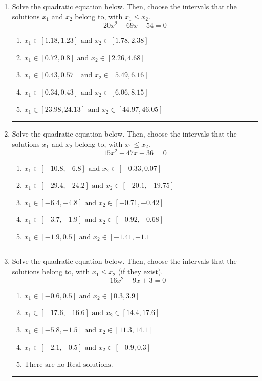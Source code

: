 \documentclass[14pt]{extbook}
\newcommand{\litem}[1]{\item#1\hspace*{-1cm}\rule{\textwidth}{0.4pt}}
\begin{document}
\begin{enumerate}
{\begin{enumerate}[label=\Alph*.]
\end{enumerate} }
\litem{
Solve the quadratic equation below. Then, choose the intervals that the solutions $x_1$ and $x_2$ belong to, with $x_1 \leq x_2$.\[ 20x^{2} -69 x + 54 = 0 \]\begin{enumerate}[label=\Alph*.]
\item \( x_1 \in [1.18, 1.23] \text{ and } x_2 \in [1.78, 2.38] \)
\item \( x_1 \in [0.72, 0.8] \text{ and } x_2 \in [2.26, 4.68] \)
\item \( x_1 \in [0.43, 0.57] \text{ and } x_2 \in [5.49, 6.16] \)
\item \( x_1 \in [0.34, 0.43] \text{ and } x_2 \in [6.06, 8.15] \)
\item \( x_1 \in [23.98, 24.13] \text{ and } x_2 \in [44.97, 46.05] \)

\end{enumerate} }
\litem{
Solve the quadratic equation below. Then, choose the intervals that the solutions $x_1$ and $x_2$ belong to, with $x_1 \leq x_2$.\[ 15x^{2} +47 x + 36 = 0 \]\begin{enumerate}[label=\Alph*.]
\item \( x_1 \in [-10.8, -6.8] \text{ and } x_2 \in [-0.33, 0.07] \)
\item \( x_1 \in [-29.4, -24.2] \text{ and } x_2 \in [-20.1, -19.75] \)
\item \( x_1 \in [-6.4, -4.8] \text{ and } x_2 \in [-0.71, -0.42] \)
\item \( x_1 \in [-3.7, -1.9] \text{ and } x_2 \in [-0.92, -0.68] \)
\item \( x_1 \in [-1.9, 0.5] \text{ and } x_2 \in [-1.41, -1.1] \)

\end{enumerate} }
\litem{
Solve the quadratic equation below. Then, choose the intervals that the solutions belong to, with $x_1 \leq x_2$ (if they exist).\[ -16x^{2} -9 x + 3 = 0 \]\begin{enumerate}[label=\Alph*.]
\item \( x_1 \in [-0.6, 0.5] \text{ and } x_2 \in [0.3, 3.9] \)
\item \( x_1 \in [-17.6, -16.6] \text{ and } x_2 \in [14.4, 17.6] \)
\item \( x_1 \in [-5.8, -1.5] \text{ and } x_2 \in [11.3, 14.1] \)
\item \( x_1 \in [-2.1, -0.5] \text{ and } x_2 \in [-0.9, 0.3] \)
\item \( \text{There are no Real solutions.} \)

\end{enumerate} }
\end{enumerate}
\end{document}
